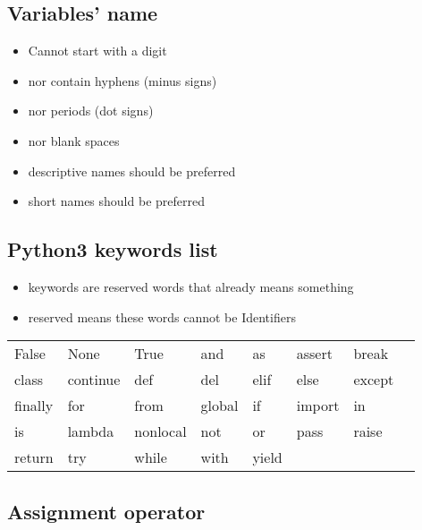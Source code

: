 \documentclass[11pt]{article}
\providecommand{\tightlist}{%
      \setlength{\itemsep}{0pt}\setlength{\parskip}{0pt}}
\begin{document}
    \hypertarget{variables-name}{%
\subsection{Variables' name}\label{variables-name}}

\begin{itemize}
\tightlist
\item
  Cannot start with a digit
\item
  nor contain hyphens (minus signs)
\item
  nor periods (dot signs)
\item
  nor blank spaces
\item
  descriptive names should be preferred
\item
  short names should be preferred
\end{itemize}

    \hypertarget{python3-keywords-list}{%
\subsection{Python3 keywords list}\label{python3-keywords-list}}

\begin{itemize}
\tightlist
\item
  keywords are reserved words that already means something
\item
  reserved means these words cannot be Identifiers
\end{itemize}

\begin{longtable}[]{@{}llllllll@{}}
\toprule
\endhead
False & None & True & and & as & assert & break & \\
class & continue & def & del & elif & else & except & \\
finally & for & from & global & if & import & in & \\
is & lambda & nonlocal & not & or & pass & raise & \\
return & try & while & with & yield & & & \\
\bottomrule
\end{longtable}

    \hypertarget{assignment-operator}{%
\subsection{Assignment operator}\label{assignment-operator}}
\end{document}
